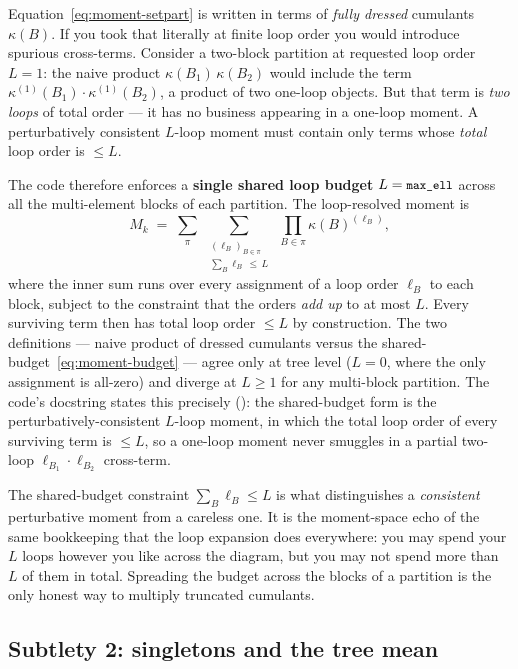 Equation~\eqref{eq:moment-setpart} is written in terms of \emph{fully dressed}
cumulants $\kappa(B)$. If you took that literally at finite loop order you would
introduce spurious cross-terms. Consider a two-block partition at requested loop
order $L=1$: the naive product $\kappa(B_1)\,\kappa(B_2)$ would include the term
$\kappa^{(1)}(B_1)\cdot\kappa^{(1)}(B_2)$, a product of two one-loop objects. But
that term is \emph{two loops} of total order --- it has no business appearing in a
one-loop moment. A perturbatively consistent $L$-loop moment must contain only
terms whose \emph{total} loop order is $\le L$.

The code therefore enforces a \textbf{single shared loop budget} $L=\texttt{\small max\_ell}$
across all the multi-element blocks of each partition. The loop-resolved moment is
\begin{equation}
  M_k
  \;=\;
  \sum_{\pi}
  \;\sum_{\substack{(\ell_B)_{B\in\pi}\\[1pt]\sum_B \ell_B\,\le\,L}}
  \;\prod_{B\in\pi}\kappa(B)^{(\ell_B)},
  \label{eq:moment-budget}
\end{equation}
where the inner sum runs over every assignment of a loop order $\ell_B$ to each
block, subject to the constraint that the orders \emph{add up} to at most $L$.
Every surviving term then has total loop order $\le L$ by construction. The two
definitions --- naive product of dressed cumulants versus the
shared-budget~\eqref{eq:moment-budget} --- agree only at tree level ($L=0$, where
the only assignment is all-zero) and diverge at $L\ge1$ for any multi-block
partition. The code's docstring states this precisely
(): the shared-budget form is the
perturbatively-consistent $L$-loop moment, in which the total loop order of every
surviving term is $\le L$, so a one-loop moment never smuggles in a partial
two-loop $\ell_{B_1}\!\cdot\ell_{B_2}$ cross-term.

\begin{note}
The shared-budget constraint $\sum_B \ell_B\le L$ is what distinguishes a
\emph{consistent} perturbative moment from a careless one. It is the moment-space
echo of the same bookkeeping that the loop expansion does everywhere: you may
spend your $L$ loops however you like across the diagram, but you may not spend
more than $L$ of them in total. Spreading the budget across the blocks of a
partition is the only honest way to multiply truncated cumulants.
\end{note}

\subsection{Subtlety 2: singletons and the tree mean}

